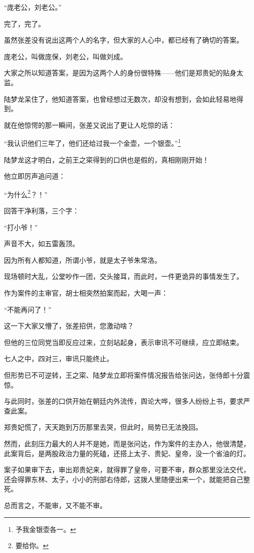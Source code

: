 \begin{multicols}{\theparacolNo}
		“庞老公，刘老公。”

		完了，完了。

		虽然张差没有说出这两个人的名字，但大家的人心中，都已经有了确切的答案。

		庞老公，叫做庞保，刘老公，叫做刘成。

		大家之所以知道答案，是因为这两个人的身份很特殊——他们是郑贵妃的贴身太监。

		陆梦龙呆住了，他知道答案，也曾经想过无数次，却没有想到，会如此轻易地得到。

		就在他惊愕的那一瞬间，张差又说出了更让人吃惊的话：

		“我认识他们三年了，他们还给过我一个金壶，一个银壶。”\footnote{予我金银壶各一。}

		陆梦龙这才明白，之前王之寀得到的口供也是假的，真相刚刚开始！

		他立即厉声追问道：

		“为什么\footnote{要给你。}？！”

		回答干净利落，三个字：

		“打小爷！”

		声音不大，如五雷轰顶。

		因为所有人都知道，所谓小爷，就是太子爷朱常洛。

		现场顿时大乱，公堂吵作一团，交头接耳，而此时，一件更诡异的事情发生了。

		作为案件的主审官，胡士相突然拍案而起，大喝一声：

		“不能再问了！”

		这一下大家又懵了，张差招供，您激动啥？

		但他的三位同党当即反应过来，立刻站起身，表示审讯不可继续，应立即结束。

		七人之中，四对三，审讯只能终止。

		但形势已不可逆转，王之寀、陆梦龙立即将案件情况报告给张问达，张侍郎十分震惊。

		与此同时，张差的口供开始在朝廷内外流传，舆论大哗，很多人纷纷上书，要求严查此案。

		郑贵妃慌了，天天跑到万历那里去哭，但此时，局势已无法挽回。

		然而，此刻压力最大的人并不是她，而是张问达，作为案件的主办人，他很清楚，此案背后，是两股政治力量的死磕，还搭上太子、贵妃、皇帝，没一个省油的灯。

		案子如果审下去，审出郑贵妃来，就得罪了皇帝，可要不审，群众那里没法交代，还会得罪东林、太子，小小的刑部右侍郎，这拨人里随便出来一个，就能把自己整死。

		总而言之，不能审，又不能不审。


\end{multicols}
